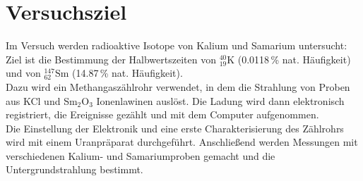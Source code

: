 \section{Versuchsziel}
Im Versuch werden radioaktive Isotope von Kalium und Samarium untersucht:
Ziel ist die Bestimmung der Halbwertszeiten von ${}^{40}_{19}\text{K}$ (0.0118\,\% nat. Häufigkeit)
und von ${}^{147}_{62}\text{Sm}$ (14.87\,\% nat. Häufigkeit).\\
Dazu wird ein Methangaszählrohr verwendet, in dem die Strahlung von Proben aus KCl und Sm$_2$O$_3$ Ionenlawinen
auslöst. Die Ladung wird dann elektronisch registriert, die Ereignisse gezählt und mit dem Computer aufgenommen.\\[\baselineskip]
Die Einstellung der Elektronik und eine erste Charakterisierung des Zählrohrs wird mit einem Uranpräparat
durchgeführt. Anschließend werden Messungen mit verschiedenen Kalium- und Samariumproben gemacht und
die Untergrundstrahlung bestimmt.